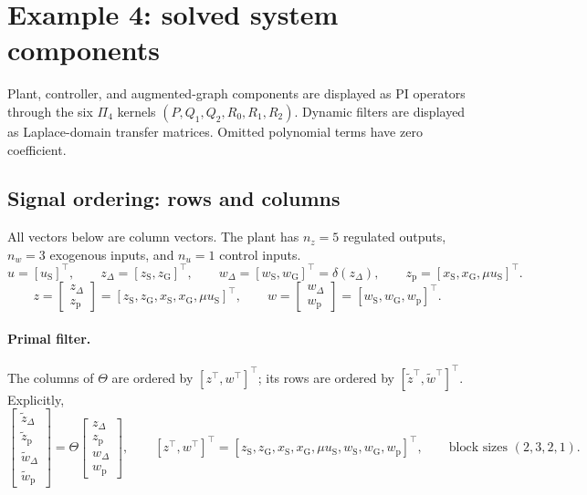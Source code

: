 \documentclass{article}
\begin{document}
\scriptsize
\section*{Example 4: solved system components}
Plant, controller, and augmented-graph components are displayed as PI operators through the six $\Pi_4$ kernels $(P,Q_1,Q_2,R_0,R_1,R_2)$. Dynamic filters are displayed as Laplace-domain transfer matrices. Omitted polynomial terms have zero coefficient.
\subsection*{Signal ordering: rows and columns}
All vectors below are column vectors. The plant has $n_z=5$ regulated outputs, $n_w=3$ exogenous inputs, and $n_u=1$ control inputs.
\[u=[u_{\mathrm S}]^\top,\qquad z_\Delta=[z_{\mathrm S},z_{\mathrm G}]^\top,\qquad w_\Delta=[w_{\mathrm S},w_{\mathrm G}]^\top=\delta(z_\Delta),\qquad z_{\mathrm p}=[x_{\mathrm S},x_{\mathrm G},\mu u_{\mathrm S}]^\top.\]
\[z=\begin{bmatrix}z_\Delta\\z_{\mathrm p}\end{bmatrix}=[z_{\mathrm S},z_{\mathrm G},x_{\mathrm S},x_{\mathrm G},\mu u_{\mathrm S}]^\top,\qquad w=\begin{bmatrix}w_\Delta\\w_{\mathrm p}\end{bmatrix}=[w_{\mathrm S},w_{\mathrm G},w_{\mathrm p}]^\top.\]
\paragraph{Primal filter.} The columns of $\Theta$ are ordered by $[z^\top,w^\top]^\top$; its rows are ordered by $[\widetilde z^\top,\widetilde w^\top]^\top$. Explicitly,
\[\begin{bmatrix}\widetilde z_\Delta\\\widetilde z_{\mathrm p}\\\widetilde w_\Delta\\\widetilde w_{\mathrm p}\end{bmatrix}=\Theta\begin{bmatrix}z_\Delta\\z_{\mathrm p}\\w_\Delta\\w_{\mathrm p}\end{bmatrix},\qquad [z^\top,w^\top]^\top=[z_{\mathrm S},z_{\mathrm G},x_{\mathrm S},x_{\mathrm G},\mu u_{\mathrm S},w_{\mathrm S},w_{\mathrm G},w_{\mathrm p}]^\top,\qquad\text{block sizes }(2,3,2,1).\]
\end{document}
